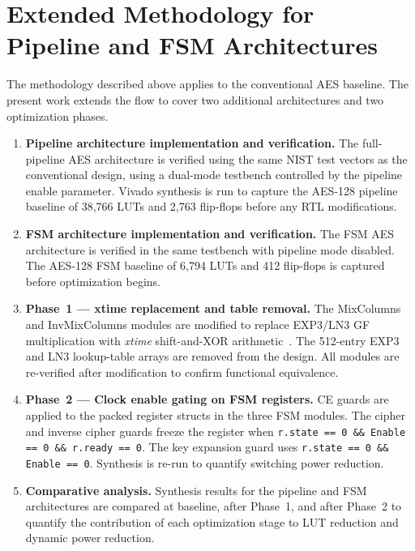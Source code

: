 \section{Extended Methodology for Pipeline and FSM Architectures}

The methodology described above applies to the conventional AES baseline. The present work
extends the flow to cover two additional architectures and two optimization phases.

\begin{enumerate}
    \item \textbf{Pipeline architecture implementation and verification.}
          The full-pipeline AES architecture is verified using the
          same NIST test vectors as the conventional design, using a dual-mode testbench
          controlled by the pipeline enable parameter.
          Vivado synthesis is run to capture the AES-128 pipeline baseline of 38,766 LUTs
          and 2,763 flip-flops before any RTL modifications.

    \item \textbf{FSM architecture implementation and verification.}
          The FSM AES architecture is verified in the same testbench with pipeline mode disabled.
          The AES-128 FSM baseline of
          6,794 LUTs and 412 flip-flops is captured before optimization begins.

    \item \textbf{Phase~1 --- xtime replacement and table removal.}
          The MixColumns and InvMixColumns modules are modified to replace
          EXP3/LN3 GF multiplication with \textit{xtime} shift-and-XOR arithmetic~\cite{wolkerstorfer_xtime_2002}.
          The 512-entry EXP3 and LN3 lookup-table arrays are removed from the design.
          All modules are re-verified after modification to confirm functional equivalence.

    \item \textbf{Phase~2 --- Clock enable gating on FSM registers.}
          CE guards are applied to the packed register structs in the three FSM modules.
          The cipher and inverse cipher guards freeze the register when
          \texttt{r.state == 0 \&\& Enable == 0 \&\& r.ready == 0}.
          The key expansion guard uses \texttt{r.state == 0 \&\& Enable == 0}.
          Synthesis is re-run to quantify switching power reduction.

    \item \textbf{Comparative analysis.}
          Synthesis results for the pipeline and FSM architectures are compared at baseline,
          after Phase~1, and after Phase~2 to quantify the contribution of each optimization
          stage to LUT reduction and dynamic power reduction.
\end{enumerate}

